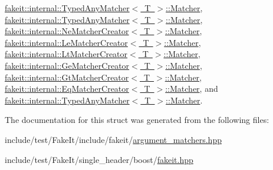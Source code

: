 \mbox{\hyperlink{structfakeit_1_1internal_1_1TypedAnyMatcher_1_1Matcher_ab992800fe5c4013e40afe8761e24e715}{fakeit\+::internal\+::\+Typed\+Any\+Matcher$<$ T $>$\+::\+Matcher}}, \mbox{\hyperlink{structfakeit_1_1internal_1_1TypedAnyMatcher_1_1Matcher_ab992800fe5c4013e40afe8761e24e715}{fakeit\+::internal\+::\+Typed\+Any\+Matcher$<$ T $>$\+::\+Matcher}}, \mbox{\hyperlink{structfakeit_1_1internal_1_1NeMatcherCreator_1_1Matcher_a29801a197f9603d4482ace2280505d1d}{fakeit\+::internal\+::\+Ne\+Matcher\+Creator$<$ T $>$\+::\+Matcher}}, \mbox{\hyperlink{structfakeit_1_1internal_1_1LeMatcherCreator_1_1Matcher_ae007fea73bae12df2c18b0043bcefd0d}{fakeit\+::internal\+::\+Le\+Matcher\+Creator$<$ T $>$\+::\+Matcher}}, \mbox{\hyperlink{structfakeit_1_1internal_1_1LtMatcherCreator_1_1Matcher_af02ee26f6d96873638c5ddf01da63d5b}{fakeit\+::internal\+::\+Lt\+Matcher\+Creator$<$ T $>$\+::\+Matcher}}, \mbox{\hyperlink{structfakeit_1_1internal_1_1GeMatcherCreator_1_1Matcher_a65b64e15033788a919d601bd7abffa15}{fakeit\+::internal\+::\+Ge\+Matcher\+Creator$<$ T $>$\+::\+Matcher}}, \mbox{\hyperlink{structfakeit_1_1internal_1_1GtMatcherCreator_1_1Matcher_a98ceb43db6430a79e739377bbb0e25f8}{fakeit\+::internal\+::\+Gt\+Matcher\+Creator$<$ T $>$\+::\+Matcher}}, \mbox{\hyperlink{structfakeit_1_1internal_1_1EqMatcherCreator_1_1Matcher_a6f34118ff7fea46a8d934cb90885c42f}{fakeit\+::internal\+::\+Eq\+Matcher\+Creator$<$ T $>$\+::\+Matcher}}, and \mbox{\hyperlink{structfakeit_1_1internal_1_1TypedAnyMatcher_1_1Matcher_ab992800fe5c4013e40afe8761e24e715}{fakeit\+::internal\+::\+Typed\+Any\+Matcher$<$ T $>$\+::\+Matcher}}.



The documentation for this struct was generated from the following files\+:\begin{DoxyCompactItemize}
\item 
include/test/\+Fake\+It/include/fakeit/\mbox{\hyperlink{argument__matchers_8hpp}{argument\+\_\+matchers.\+hpp}}\item 
include/test/\+Fake\+It/single\+\_\+header/boost/\mbox{\hyperlink{single__header_2boost_2fakeit_8hpp}{fakeit.\+hpp}}\end{DoxyCompactItemize}
